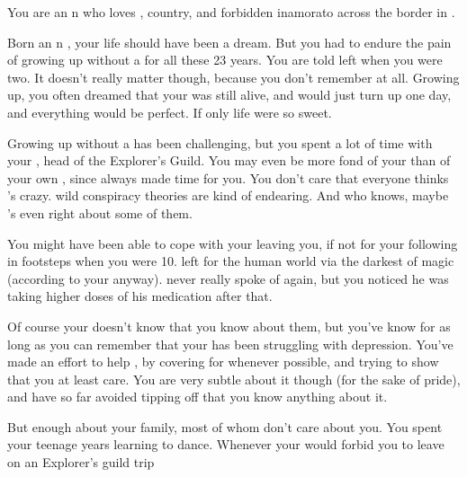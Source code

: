 \documentclass[char]{NeptuneBall}
\begin{document}
\name{\cPrincess{}}


You are an \pAtlantis{}n \cPrincess{\prince} who loves \cPrincess{\them} \cKing{\parent}, \cPrincess{\them} country, and \cPrincess{\them} forbidden inamorato across the border in \pPacifica{}.

Born an \pAtlantis{}n \cPrincess{\prince}, your life should have been a dream. But you had to endure the pain of growing up without a \cQueen{\parent} for all these 23 years. You are told \cQueen{\they} left when you were two. It doesn't really matter though, because you don't remember \cQueen{\them} at all. Growing up, you often dreamed that your \cQueen{\parent} was still alive, and would just turn up one day, and everything would be perfect. If only life were so sweet.

Growing up without a \cQueen{\parent} has been challenging, but you spent a lot of time with your \cPlant{\uncle} \cPlant{}, head of the Explorer's Guild. You may even be more fond of your \cPlant{\uncle} than of your own \cKing{\parent}, since \cPlant{} always made time for you. You don't care that everyone thinks \cPlant{\they}'s crazy. \cPlant{\Their} wild conspiracy theories are kind of endearing. And who knows, maybe \cPlant{\they}'s even right about some of them.

You might have been able to cope with your \cQueen{\parent} leaving you, if not for your \cAriel{\sibling} following in \cQueen{\them} footsteps when you were 10. \cAriel{} left for the human world via the darkest of magic (according to your \cKing{\parent} anyway). \cKing{\They} never really spoke of \cAriel{\them} again, but you noticed he was taking higher doses of his medication after that.

Of course your \cKing{\parent} doesn't know that you know about them, but you've know for as long as you can remember that your \cKing{\parent} has been struggling with depression. You've made an effort to help \cKing{\them}, by covering for \cKing{\them} whenever possible, and trying to show \cKing{\them} that you at least care. You are very subtle about it though (for the sake of \cKing{\their} pride), and have so far avoided tipping \cKing{\them} off that you know anything about it.

But enough about your family, most of whom don't care about you. You spent your teenage years learning to dance. Whenever your \cKing{\parent} would forbid you to leave on an Explorer's guild trip
\end{document}
